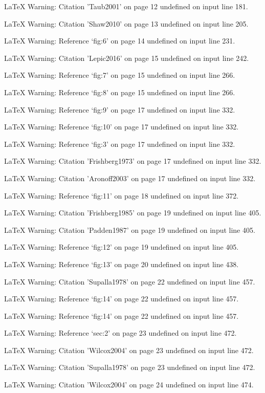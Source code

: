 LaTeX Warning: Citation 'Taub2001' on page 12 undefined on input line 181.


LaTeX Warning: Citation 'Shaw2010' on page 13 undefined on input line 205.


LaTeX Warning: Reference `fig:6' on page 14 undefined on input line 231.


LaTeX Warning: Citation 'Lepic2016' on page 15 undefined on input line 242.


LaTeX Warning: Reference `fig:7' on page 15 undefined on input line 266.


LaTeX Warning: Reference `fig:8' on page 15 undefined on input line 266.


LaTeX Warning: Reference `fig:9' on page 17 undefined on input line 332.


LaTeX Warning: Reference `fig:10' on page 17 undefined on input line 332.


LaTeX Warning: Reference `fig:3' on page 17 undefined on input line 332.


LaTeX Warning: Citation 'Frishberg1973' on page 17 undefined on input line 332.


LaTeX Warning: Citation 'Aronoff2003' on page 17 undefined on input line 332.


LaTeX Warning: Reference `fig:11' on page 18 undefined on input line 372.


LaTeX Warning: Citation 'Frishberg1985' on page 19 undefined on input line 405.


LaTeX Warning: Citation 'Padden1987' on page 19 undefined on input line 405.


LaTeX Warning: Reference `fig:12' on page 19 undefined on input line 405.


LaTeX Warning: Reference `fig:13' on page 20 undefined on input line 438.


LaTeX Warning: Citation 'Supalla1978' on page 22 undefined on input line 457.


LaTeX Warning: Reference `fig:14' on page 22 undefined on input line 457.


LaTeX Warning: Reference `fig:14' on page 22 undefined on input line 457.


LaTeX Warning: Reference `sec:2' on page 23 undefined on input line 472.


LaTeX Warning: Citation 'Wilcox2004' on page 23 undefined on input line 472.


LaTeX Warning: Citation 'Supalla1978' on page 23 undefined on input line 472.


LaTeX Warning: Citation 'Wilcox2004' on page 24 undefined on input line 474.


